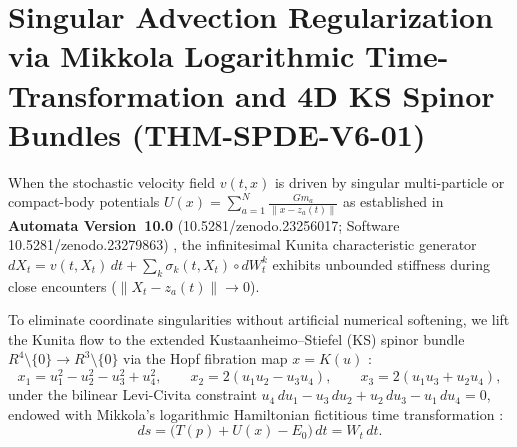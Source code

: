 \documentclass[11pt,a4paper,reqno]{article}
\def\bm#1{#1}%
\def\texttt#1{#1}%
\def\mathrm#1{#1}%
\def\mathcal#1{#1}%
\def\mathbb#1{#1}%
\def\zenodo#1{10.5281/zenodo.#1}%
\newcommand{\zenodo}[1]{\href{https://doi.org/10.5281/zenodo.#1}{\texttt{10.5281/\allowbreak zenodo.#1}}}
\theoremstyle{plain}
\theoremstyle{definition}
\theoremstyle{remark}
\numberwithin{equation}{section}
\begin{document}
\section{Singular Advection Regularization via Mikkola Logarithmic Time-Transformation and 4D KS Spinor Bundles (\texttt{THM-SPDE-V6-01})}
\label{sec:spde_mikkola_regularization}

When the stochastic velocity field $\bm{v}(t, \bm{x})$ is driven by singular multi-particle or compact-body potentials $U(\bm{x}) = \sum_{a=1}^N \frac{G m_a}{\lVert \bm{x} - \bm{z}_a(t) \rVert}$ as established in \textbf{Automata Version~10.0} (\zenodo{23256017}; Software \zenodo{23279863}) \cite{ananda2026automata_v100}, the infinitesimal Kunita characteristic generator $\mathrm{d}\bm{X}_t = \bm{v}(t, \bm{X}_t)\,\mathrm{d}t + \sum_k \bm{\sigma}_k(t, \bm{X}_t)\circ\mathrm{d}W_t^k$ exhibits unbounded stiffness during close encounters ($\lVert \bm{X}_t - \bm{z}_a(t) \rVert \to 0$).

To eliminate coordinate singularities without artificial numerical softening, we lift the Kunita flow to the extended Kustaanheimo--Stiefel (KS) spinor bundle $\mathbb{R}^4 \setminus \{\bm{0}\} \to \mathbb{R}^3 \setminus \{\bm{0}\}$ via the Hopf fibration map $\bm{x} = \mathcal{K}(\bm{u})$ \cite{KustaanheimoStiefel1965}:
\begin{equation}
x_1 = u_1^2 - u_2^2 - u_3^2 + u_4^2, \qquad
x_2 = 2(u_1 u_2 - u_3 u_4), \qquad
x_3 = 2(u_1 u_3 + u_2 u_4),
\label{eq:ks_hopf_map}
\end{equation}
under the bilinear Levi-Civita constraint $u_4\,\mathrm{d}u_1 - u_3\,\mathrm{d}u_2 + u_2\,\mathrm{d}u_3 - u_1\,\mathrm{d}u_4 = 0$, endowed with Mikkola's logarithmic Hamiltonian fictitious time transformation \cite{MikkolaTanikawa1999}:
\begin{equation}
\mathrm{d}s = \big(T(\bm{p}) + U(\bm{x}) - E_0\big)\,\mathrm{d}t = \mathcal{W}_t\,\mathrm{d}t.
\label{eq:mikkola_time_regularization}
\end{equation}
\end{document}
